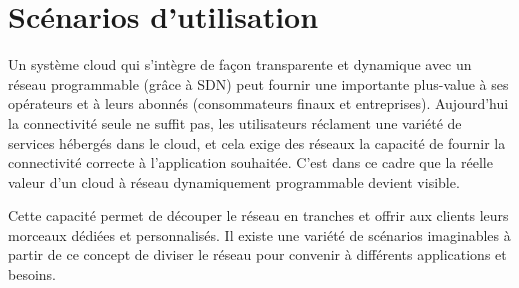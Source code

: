 
\section{Scénarios d'utilisation}

Un système cloud qui s'intègre de façon transparente et dynamique avec un réseau programmable (grâce à SDN) peut fournir une importante plus-value à ses opérateurs et à leurs abonnés (consommateurs finaux et entreprises). Aujourd'hui la connectivité seule ne suffit pas, les utilisateurs réclament une variété de services hébergés dans le cloud, et cela exige des réseaux la capacité de fournir la connectivité correcte à l'application souhaitée. C'est dans ce cadre que  la réelle valeur d'un cloud à réseau dynamiquement programmable  devient visible.

Cette capacité permet de découper le réseau en tranches et offrir aux clients leurs morceaux dédiées et personnalisés. Il existe une variété de scénarios imaginables  à partir de ce concept de diviser le réseau pour convenir à différents applications et besoins.


